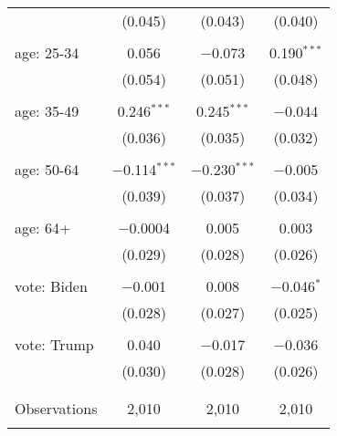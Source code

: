 \begin{tabular}{@{\extracolsep{5pt}}lccc}
  & (0.045) & (0.043) & (0.040) \\ 
  & & & \\ 
 age: 25-34 & 0.056 & $-$0.073 & 0.190$^{***}$ \\ 
  & (0.054) & (0.051) & (0.048) \\ 
  & & & \\ 
 age: 35-49 & 0.246$^{***}$ & 0.245$^{***}$ & $-$0.044 \\ 
  & (0.036) & (0.035) & (0.032) \\ 
  & & & \\ 
 age: 50-64 & $-$0.114$^{***}$ & $-$0.230$^{***}$ & $-$0.005 \\ 
  & (0.039) & (0.037) & (0.034) \\ 
  & & & \\ 
 age: 64+ & $-$0.0004 & 0.005 & 0.003 \\ 
  & (0.029) & (0.028) & (0.026) \\ 
  & & & \\ 
 vote: Biden & $-$0.001 & 0.008 & $-$0.046$^{*}$ \\ 
  & (0.028) & (0.027) & (0.025) \\ 
  & & & \\ 
 vote: Trump & 0.040 & $-$0.017 & $-$0.036 \\ 
  & (0.030) & (0.028) & (0.026) \\ 
  & & & \\ 
\hline \\[-1.8ex] 

Observations & 2,010 & 2,010 & 2,010 \\ 
\hline 
\hline \\[-1.8ex] 
\end{tabular} 